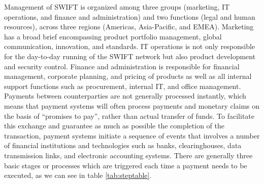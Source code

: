 \documentclass[12pt]{article}
\begin{document}
        Management of SWIFT is organized among three groups (marketing, IT operations, and finance and administration) and two functions (legal and human resources), across three regions (Americas, Asia-Pacific, and EMEA). Marketing has a broad brief encompassing product portfolio management, global communication, innovation, and standards. IT operations is not only responsible for the day-to-day running of the SWIFT network but also product development and security control. Finance and administration is responsible for financial management, corporate planning, and pricing of products as well as all internal support functions such as procurement, internal IT, and office management.
        Payments between counterparties are not generally processed instantly, which means that payment systems will often process payments and monetary claims on the basis of “promises to pay”, rather than actual transfer of funds. To facilitate this exchange and guarantee as much as possible the completion of the transaction, payment systems initiate a sequence of events that involves a number of financial institutions and technologies such as banks, clearinghouses, data transmission links, and electronic accounting systems. There are generally three basic stages or processes which are triggered each time a payment needs to be executed, as we can see in table \ref{tab:steptable}.
\end{document}
